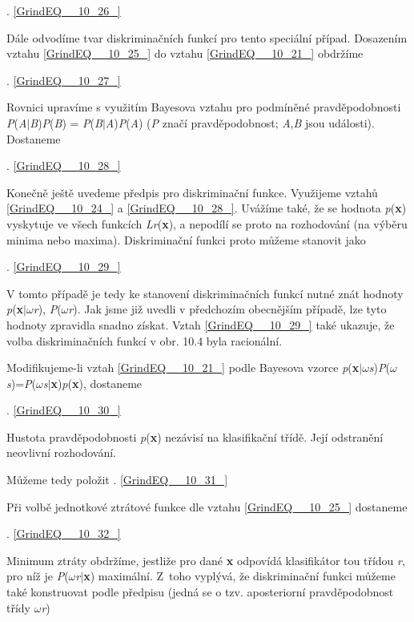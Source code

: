  . \eqref{GrindEQ__10_26_}

\noindent Dále odvodíme tvar diskriminačních funkcí pro tento speciální případ. Dosazením vztahu \eqref{GrindEQ__10_25_} do vztahu \eqref{GrindEQ__10_21_} obdržíme

 . \eqref{GrindEQ__10_27_}

\noindent Rovnici upravíme s využitím Bayesova vztahu pro podmíněné pravděpodobnosti \textit{P}(\textit{A}$\mid$\textit{B})\textit{P}(\textit{B}) = \textit{P}(\textit{B}$\mid$\textit{A})\textit{P}(\textit{A}) (\textit{P} značí pravděpodobnost; \textit{A},\textit{B} jsou události). Dostaneme

 . \eqref{GrindEQ__10_28_}

\noindent Konečně ještě uvedeme předpis pro diskriminační funkce. Využijeme vztahů \eqref{GrindEQ__10_24_} a \eqref{GrindEQ__10_28_}. Uvážíme také, že se hodnota \textit{p}(\textbf{x}) vyskytuje ve všech funkcích \textit{Lr}(\textbf{x}), a nepodílí se proto na rozhodování (na výběru minima nebo maxima). Diskriminační funkci proto můžeme stanovit jako 

 . \eqref{GrindEQ__10_29_}

\noindent V tomto případě je tedy ke stanovení diskriminačních funkcí nutné znát hodnoty  \textit{p}(\textbf{x}$\mid$$\omega$\textit{r}), \textit{P}($\omega$\textit{r}). Jak jsme již uvedli v předchozím obecnějším případě, lze tyto hodnoty zpravidla snadno získat. Vztah \eqref{GrindEQ__10_29_} také ukazuje, že volba diskriminačních funkcí v obr. 10.4 byla racionální.

\noindent Modifikujeme-li vztah \eqref{GrindEQ__10_21_} podle Bayesova vzorce \textit{p}(\textbf{x}$\mid$$\omega$\textit{s})\textit{P}($\omega$\textit{s})=\textit{P}($\omega$\textit{s}$\mid$\textbf{x})\textit{p}(\textbf{x}), dostaneme

 . \eqref{GrindEQ__10_30_}

\noindent Hustota pravděpodobnosti \textit{p}(\textbf{x}) nezávisí na klasifikační třídě. Její odstranění neovlivní rozhodování. 

\noindent Můžeme tedy položit . \eqref{GrindEQ__10_31_}

\noindent Při volbě jednotkové ztrátové funkce dle vztahu \eqref{GrindEQ__10_25_} dostaneme

 . \eqref{GrindEQ__10_32_}

\noindent Minimum ztráty obdržíme, jestliže pro dané \textbf{x} odpovídá klasifikátor tou třídou \textit{r}, pro níž je \textit{P}($\omega$\textit{r}$\mid$\textbf{x}) maximální. Z~toho vyplývá, že diskriminační funkci můžeme také konstruovat podle předpisu (jedná se o tzv. aposteriorní pravděpodobnost třídy $\omega$\textit{r})

